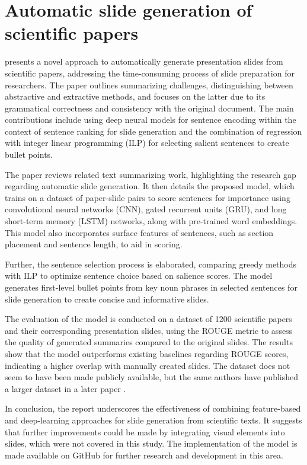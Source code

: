 \section{Automatic slide generation of scientific papers}

\citet{Sefid:2019:K-CAP} presents a novel approach to automatically generate presentation slides from scientific papers, addressing the time-consuming process of slide preparation for researchers. The paper outlines summarizing challenges, distinguishing between abstractive and extractive methods, and focuses on the latter due to its grammatical correctness and consistency with the original document. The main contributions include using deep neural models for sentence encoding within the context of sentence ranking for slide generation and the combination of regression with integer linear programming (ILP) for selecting salient sentences to create bullet points.

The paper reviews related text summarizing work, highlighting the research gap regarding automatic slide generation. It then details the proposed model, which trains on a dataset of paper-slide pairs to score sentences for importance using convolutional neural networks (CNN), gated recurrent units (GRU), and long short-term memory (LSTM) networks, along with pre-trained word embeddings. This model also incorporates surface features of sentences, such as section placement and sentence length, to aid in scoring.

Further, the sentence selection process is elaborated, comparing greedy methods with ILP to optimize sentence choice based on salience scores. The model generates first-level bullet points from key noun phrases in selected sentences for slide generation to create concise and informative slides.

The evaluation of the model is conducted on a dataset of 1200 scientific papers and their corresponding presentation slides, using the ROUGE metric to assess the quality of generated summaries compared to the original slides. The results show that the model outperforms existing baselines regarding ROUGE scores, indicating a higher overlap with manually created slides. The dataset does not seem to have been made publicly available, but the same authors have published a larger dataset in a later paper \citep{Sefid:2021:arXiv}.

In conclusion, the report underscores the effectiveness of combining feature-based and deep-learning approaches for slide generation from scientific texts. It suggests that further improvements could be made by integrating visual elements into slides, which were not covered in this study. The implementation of the model is made available on GitHub for further research and development in this area.

